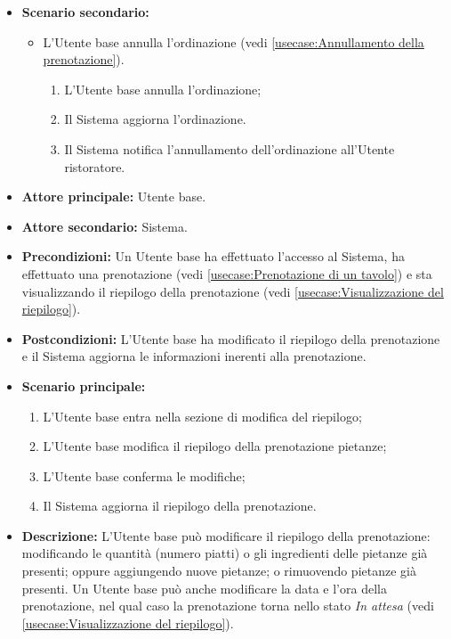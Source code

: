 \begin{itemize}
	\item \textbf{Scenario secondario:}
	      \begin{itemize}
		      \item L'Utente base annulla l'ordinazione (vedi
		            \autoref{usecase:Annullamento della prenotazione}).
		            \begin{enumerate}
			            \item L'Utente base annulla l'ordinazione;
			            \item Il Sistema aggiorna l'ordinazione.
			            \item Il Sistema notifica l'annullamento dell'ordinazione
			                  all'Utente ristoratore.
		            \end{enumerate}
	      \end{itemize}
\end{itemize}


\label{usecase:Aggiornamento del riepilogo}
\begin{itemize}
	\item \textbf{Attore principale:} Utente base.

	\item \textbf{Attore secondario:} Sistema.

	\item \textbf{Precondizioni:}
	      Un Utente base ha effettuato l'accesso al Sistema, ha effettuato una
	      prenotazione (vedi \autoref{usecase:Prenotazione di un tavolo}) e
	      sta visualizzando il riepilogo della prenotazione
	      (vedi \autoref{usecase:Visualizzazione del riepilogo}).

	\item \textbf{Postcondizioni:}
	      L'Utente base ha modificato il riepilogo della prenotazione e il Sistema
	      aggiorna le informazioni inerenti alla prenotazione.

	\item \textbf{Scenario principale:}
	      \begin{enumerate}
		      \item L'Utente base entra nella sezione di modifica del riepilogo;
		      \item L'Utente base modifica il riepilogo della prenotazione pietanze;
		      \item L'Utente base conferma le modifiche;
		      \item Il Sistema aggiorna il riepilogo della prenotazione.
	      \end{enumerate}

	\item \textbf{Descrizione:} L'Utente base può modificare il riepilogo della
	      prenotazione: modificando le quantità (numero piatti) o gli
	      ingredienti delle pietanze già presenti; oppure aggiungendo nuove
	      pietanze; o rimuovendo pietanze già presenti. Un Utente base può
	      anche modificare la data e l'ora della prenotazione, nel qual caso la
	      prenotazione torna nello stato \textit{In attesa} (vedi
	      \autoref{usecase:Visualizzazione del riepilogo}).
\end{itemize}
